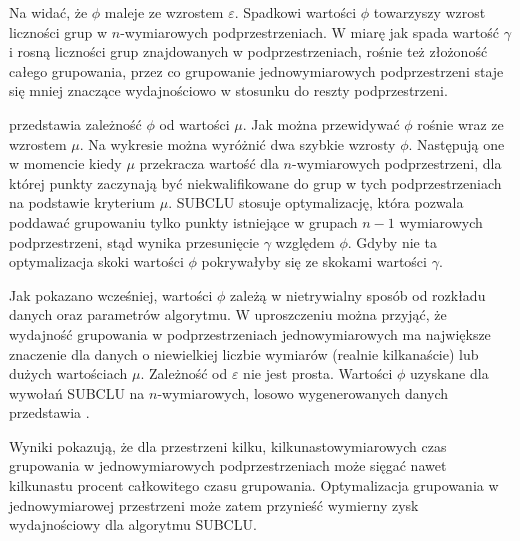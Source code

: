 

Na  widać, że $ \phi $ maleje ze wzrostem $ \varepsilon $. Spadkowi wartości $ \phi $ towarzyszy wzrost liczności grup w $ n $-wymiarowych podprzestrzeniach. W miarę jak spada wartość $ \gamma $ i rosną liczności grup znajdowanych w podprzestrzeniach, rośnie też złożoność całego grupowania, przez co grupowanie jednowymiarowych podprzestrzeni staje się mniej znaczące wydajnościowo w stosunku do reszty podprzestrzeni.\par

 przedstawia zależność $ \phi $ od wartości $ \mu $. Jak można przewidywać $ \phi $ rośnie wraz ze wzrostem $ \mu $. Na wykresie można wyróżnić dwa szybkie wzrosty $ \phi $. Następują one w momencie kiedy $ \mu $ przekracza wartość dla $ n $-wymiarowych podprzestrzeni, dla której punkty zaczynają być niekwalifikowane do grup w tych podprzestrzeniach na podstawie kryterium $ \mu $. SUBCLU stosuje optymalizację, która pozwala poddawać grupowaniu tylko punkty istniejące w grupach $ n-1 $ wymiarowych podprzestrzeni, stąd wynika przesunięcie $ \gamma $ względem $ \phi $. Gdyby nie ta optymalizacja skoki wartości $ \phi $ pokrywałyby się ze skokami wartości $ \gamma $.

Jak pokazano wcześniej, wartości $ \phi $ zależą w nietrywialny sposób od rozkładu danych oraz parametrów algorytmu. W uproszczeniu można przyjąć, że wydajność grupowania w podprzestrzeniach jednowymiarowych ma największe znaczenie dla danych o niewielkiej liczbie wymiarów (realnie kilkanaście) lub dużych wartościach $ \mu $. Zależność od $ \varepsilon $ nie jest prosta. Wartości $ \phi $ uzyskane dla wywołań SUBCLU na $ n $-wymiarowych, losowo wygenerowanych danych przedstawia .



Wyniki pokazują, że dla przestrzeni kilku, kilkunastowymiarowych czas grupowania w jednowymiarowych podprzestrzeniach może sięgać nawet kilkunastu procent całkowitego czasu grupowania. Optymalizacja grupowania w jednowymiarowej przestrzeni może zatem przynieść wymierny zysk wydajnościowy dla algorytmu SUBCLU. 

